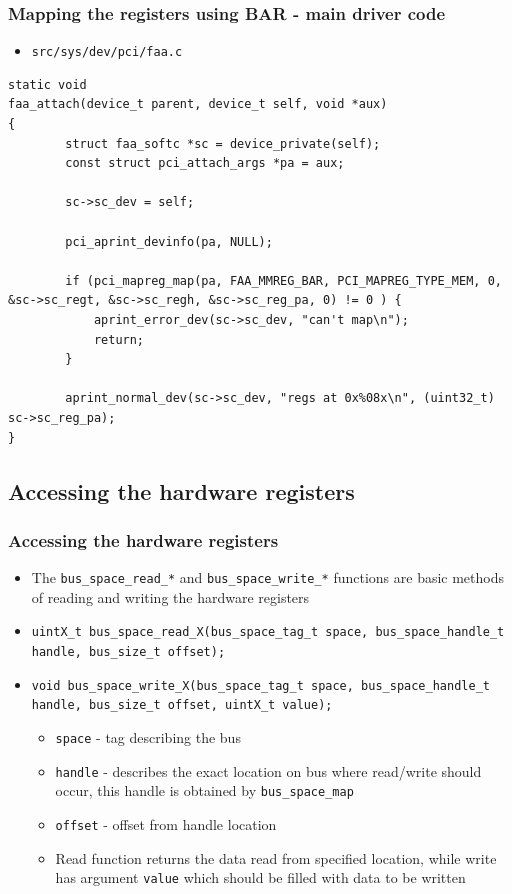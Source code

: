 \documentclass[dvipsnames,table]{beamer}
\begin{document}
\begin{frame}[fragile]
\frametitle{Mapping the registers using BAR - main driver code}
\scriptsize
\begin{itemize}
	\item {\tt src/sys/dev/pci/faa.c}
\end{itemize}
\begin{lstlisting}
static void
faa_attach(device_t parent, device_t self, void *aux)
{
        struct faa_softc *sc = device_private(self);
        const struct pci_attach_args *pa = aux;

        sc->sc_dev = self;

        pci_aprint_devinfo(pa, NULL);

        if (pci_mapreg_map(pa, FAA_MMREG_BAR, PCI_MAPREG_TYPE_MEM, 0, &sc->sc_regt, &sc->sc_regh, &sc->sc_reg_pa, 0) != 0 ) {
            aprint_error_dev(sc->sc_dev, "can't map\n");
            return;
        }

        aprint_normal_dev(sc->sc_dev, "regs at 0x%08x\n", (uint32_t) sc->sc_reg_pa);
}
\end{lstlisting}
\end{frame}

\subsection{Accessing the hardware registers}

\begin{frame}
\frametitle{Accessing the hardware registers}
\begin{itemize}
	\item The {\tt bus\_space\_read\_*} and {\tt bus\_space\_write\_*} functions are basic methods of reading and writing the hardware registers
	\item {\tt uintX\_t bus\_space\_read\_X(bus\_space\_tag\_t space, bus\_space\_handle\_t handle, bus\_size\_t offset);}
	\item {\tt void bus\_space\_write\_X(bus\_space\_tag\_t space, bus\_space\_handle\_t handle, bus\_size\_t offset, uintX\_t value);}
	\begin{itemize}
		\item {\tt space} - tag describing the bus
		\item {\tt handle} - describes the exact location on bus where read/write should occur, this handle is obtained by {\tt bus\_space\_map}
		\item {\tt offset} - offset from handle location
		\item Read function returns the data read from specified location, while write has argument {\tt value} which should be filled with data to be written
	\end{itemize}
\end{itemize}
\end{frame}
\end{document}
